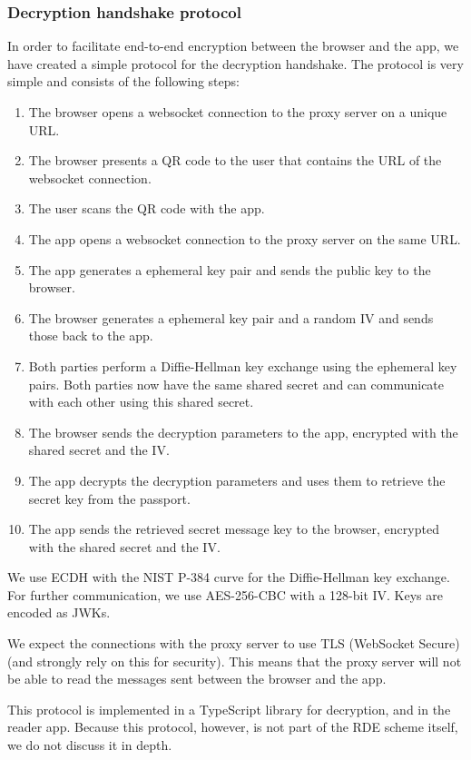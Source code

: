 \subsubsection{Decryption handshake protocol} \label{subsubsec:decryption-handshake-protocol}
In order to facilitate end-to-end encryption between the browser and the app, we have created a simple protocol for the decryption handshake.
The protocol is very simple and consists of the following steps:
\begin{enumerate}
    \item The browser opens a websocket connection to the proxy server on a unique URL.
    \item The browser presents a QR code to the user that contains the URL of the websocket connection.
    \item The user scans the QR code with the app.
    \item The app opens a websocket connection to the proxy server on the same URL.
    \item The app generates a ephemeral key pair and sends the public key to the browser.
    \item The browser generates a ephemeral key pair and a random IV and sends those back to the app.
    \item Both parties perform a Diffie-Hellman key exchange using the ephemeral key pairs.
    Both parties now have the same shared secret and can communicate with each other using this shared secret.
    \item The browser sends the decryption parameters to the app, encrypted with the shared secret and the IV.
    \item The app decrypts the decryption parameters and uses them to retrieve the secret key from the passport.
    \item The app sends the retrieved secret message key to the browser, encrypted with the shared secret and the IV.
\end{enumerate}

We use ECDH with the NIST P-384 curve for the Diffie-Hellman key exchange.
For further communication, we use AES-256-CBC with a 128-bit IV.
Keys are encoded as JWKs.

We expect the connections with the proxy server to use TLS (WebSocket Secure) (and strongly rely on this for security).
This means that the proxy server will not be able to read the messages sent between the browser and the app.

This protocol is implemented in a TypeScript library for decryption, and in the reader app.
Because this protocol, however, is not part of the RDE scheme itself, we do not discuss it in depth.

